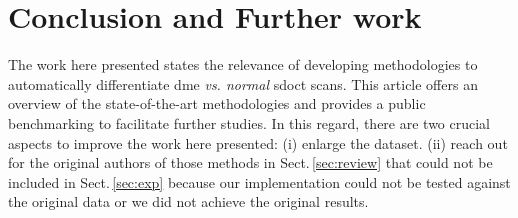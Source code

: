 \documentclass[conference,twocolumn,letterpaper,10pt]{latex/IEEEtran}
\begin{document}
\begin{IEEEkeywords}
\end{IEEEkeywords}

\linenumbers






\section{Conclusion and Further work}\label{sec:conclusion}
The work here presented states the relevance of developing methodologies to automatically differentiate \gls{dme} \emph{vs. normal} \gls{sdoct} scans.
This article offers an overview of the state-of-the-art methodologies and provides a public benchmarking to facilitate further studies.
In this regard, there are two crucial aspects to improve the work here presented:
(i) enlarge the dataset.
(ii) reach out for the original authors of those methods in Sect.\,\ref{sec:review} that could not be included in Sect.\,\ref{sec:exp} because our implementation could not be tested against the original data or we did not achieve the original results.

\nolinenumbers

%
%

% 


\end{document}
